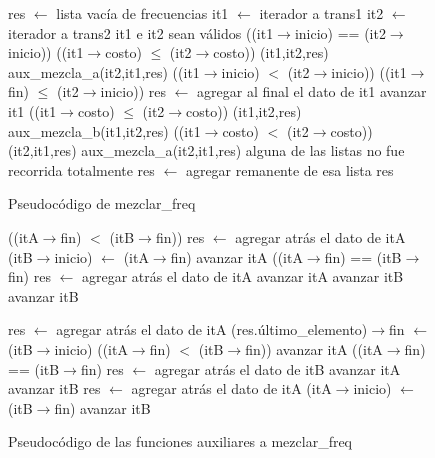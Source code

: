 \begin{figure}[!ht]
\begin{codebox}
\li res $\leftarrow$ lista vacía de frecuencias
\li it1 $\leftarrow$ iterador a trans1
\li it2 $\leftarrow$ iterador a trans2
\li \While it1 e it2 sean válidos
\li		\Do 
 		\If ((it1$\rightarrow$inicio) == (it2$\rightarrow$inicio))
\li 			\Then
				\If ((it1$\rightarrow$costo) $\leq$ (it2$\rightarrow$costo))
\li					{}(it1,it2,res)
\li				\Else
					{\sc aux_mezcla_a}(it2,it1,res)
				\End
\li 			\Else
				\If ((it1$\rightarrow$inicio) $<$ (it2$\rightarrow$inicio))
\li				\Then
					\If ((it1$\rightarrow$fin) $\leq$ (it2$\rightarrow$inicio))
\li					\Then
						res $\leftarrow$ agregar al final el dato de it1
\li						avanzar it1
\li					\Else
\li 						\If ((it1$\rightarrow$costo) $\leq$ (it2$\rightarrow$costo))
\li							\Then {\sc aux_mezcla_a}(it1,it2,res)
\li							\Else
								{\sc aux_mezcla_b}(it1,it2,res)
							\End
					\End
\li 				\Else 
\li					\If ((it1$\rightarrow$costo) $<$ (it2$\rightarrow$costo))
\li 						\Then {\sc aux_mezcla_b}(it2,it1,res)
\li 						\Else
 							{\sc aux_mezcla_a}(it2,it1,res)
 						\End
 				\End
 			\End
 		\End
\li \If alguna de las listas no fue recorrida totalmente
\li 		\Then res $\leftarrow$ agregar remanente de esa lista
		\End
\li \Return res
\end{codebox}
\caption{Pseudocódigo de mezclar_freq} \label{code:mezclar}
\end{figure}

\begin{figure}[!ht]
\begin{codebox}
\li	\If((itA$\rightarrow$fin) $<$ (itB$\rightarrow$fin))
\li 		\Then
			res $\leftarrow$ agregar atrás el dato de itA
\li 			(itB$\rightarrow$inicio) $\leftarrow$ (itA$\rightarrow$fin)
\li			avanzar itA
\li 		\Else
			\If ((itA$\rightarrow$fin) == (itB$\rightarrow$fin)
\li				res $\leftarrow$ agregar atrás el dato de itA
\li 				avanzar itA
\li 				avanzar itB
\li 		\Else avanzar itB
		\End
\li		\Return
\end{codebox}

\begin{codebox}
\li res $\leftarrow$ agregar atrás el dato de itA
\li (res.último_elemento)$\rightarrow$fin $\leftarrow$ (itB$\rightarrow$inicio)
\li	\If((itA$\rightarrow$fin) $<$ (itB$\rightarrow$fin))
\li 		\Then avanzar itA
\li 		\Else
			\If ((itA$\rightarrow$fin) == (itB$\rightarrow$fin)
\li				res $\leftarrow$ agregar atrás el dato de itB
\li 				avanzar itA
\li 				avanzar itB
\li 		\Else 
			res $\leftarrow$ agregar atrás el dato de itA
\li 			(itA$\rightarrow$inicio) $\leftarrow$ (itB$\rightarrow$fin)
\li			avanzar itB
		\End
\li		\Return
\end{codebox}
\caption{Pseudocódigo de las funciones auxiliares a mezclar_freq} \label{code:aux}
\end{figure}

